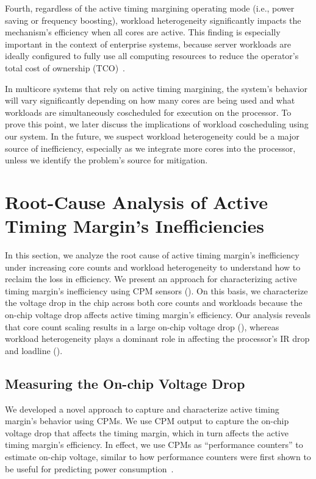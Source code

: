 Fourth, regardless of the active timing margining operating mode (i.e., power saving or frequency boosting), workload heterogeneity significantly impacts the mechanism's efficiency when all cores are active. This finding is especially important in the context of enterprise systems, because server workloads are ideally configured to fully use all computing resources to reduce the operator's total cost of ownership (TCO)~\cite{barroso2007case}. 

In multicore systems that rely on active timing margining, the system's behavior will vary significantly depending on how many cores are being used and what workloads are simultaneously coscheduled for execution on the processor. To prove this point, we later discuss the implications of workload coscheduling using our system. In the future, we suspect workload heterogeneity could be a major source of inefficiency, especially as we integrate more cores into the processor, unless we identify the problem's source for mitigation.

\section{Root-Cause Analysis of Active Timing Margin's Inefficiencies}
\label{sec:voltage:rootcause}

In this section, we analyze the root cause of active timing margin's inefficiency under increasing core counts and workload heterogeneity to understand how to reclaim the loss in efficiency. We present an approach for characterizing active timing margin's inefficiency using CPM sensors (). On this basis, we characterize the voltage drop in the chip across both core counts and workloads because the on-chip voltage drop affects active timing margin's efficiency. Our analysis reveals that core count scaling results in a large on-chip voltage drop (), whereas workload heterogeneity plays a dominant role in affecting the processor's IR drop and loadline ().

\subsection{Measuring the On-chip Voltage Drop}
\label{sec:voltage:rootcause:cpm-measurement}

We developed a novel approach to capture and characterize active timing margin's behavior using CPMs. We use CPM output to capture the on-chip voltage drop that affects the timing margin, which in turn affects the active timing margin's efficiency. In effect, we use CPMs as ``performance counters'' to estimate on-chip voltage, similar to how performance counters were first shown to be useful for predicting power consumption~\cite{isci2003runtime,huang2012accurate}.


